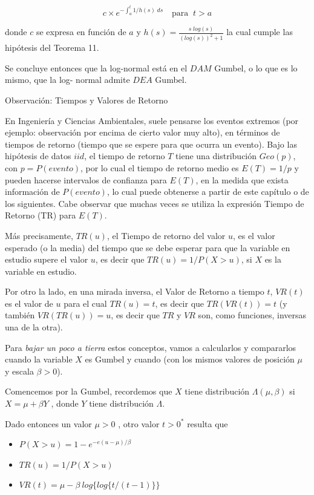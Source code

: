 \documentclass[
]{book}
\theoremstyle{definition}
\theoremstyle{definition}
\theoremstyle{definition}
\theoremstyle{definition}
\theoremstyle{remark}
\begin{document}
\begin{equation}
c\times e^{-\int_{a}^{t}1/h(s)\; ds} \quad \text{para }\: t>a
\end{equation}

donde \(c\) se expresa en función de \(a\) y \(h(s)=\frac{s\; log(s)}{(log(s))^2+1}\) la cual cumple las hipótesis del Teorema 11.

Se concluye entonces que la log-normal está en el \(DAM\) Gumbel, o lo que es lo mismo, que la log- normal admite \(DEA\) Gumbel.

Observación: Tiempos y Valores de Retorno

En Ingeniería y Ciencias Ambientales, suele pensarse los eventos extremos (por ejemplo: observación por encima de cierto valor muy alto), en términos de tiempos de retorno (tiempo que se espere para que ocurra un evento). Bajo las hipótesis de datos \(iid\), el tiempo de retorno \(T\) tiene una distribución \(Geo(p)\), con \(p = P(evento)\), por lo cual el tiempo de retorno medio es \(E(T)=1/p\) y pueden hacerse intervalos de confianza para \(E(T)\), en la medida que exista información de \(P(evento)\), lo cual puede obtenerse a partir de este capítulo o de los siguientes. Cabe observar que muchas veces se utiliza la expresión Tiempo de Retorno (TR) para \(E(T)\).

Más precisamente, \(TR(u)\), el Tiempo de retorno del valor \(u\), es el valor esperado (o la media) del tiempo que se debe esperar para que la variable en estudio supere el valor \(u\), es decir que \(TR(u) = 1/P(X>u)\), si \(X\) es la variable en estudio.

Por otro la lado, en una mirada inversa, el Valor de Retorno a tiempo \(t\), \(VR(t)\) es el valor de \(u\) para el cual \(TR(u)=t\), es decir que \(TR(VR(t))=t\) (y también \(VR(TR(u))=u\), es decir que \(TR\) y \(VR\) son, como funciones, inversas una de la otra).

Para \textit{bajar un poco a tierra} estos conceptos, vamos a calcularlos y compararlos cuando la variable \(X\) es Gumbel y cuando (con los mismos valores de posición \(\mu\) y escala \(\beta>0\)).

Comencemos por la Gumbel, recordemos que \(X\) tiene distribución \(\Lambda( \mu,\beta)\) si \(X= \mu+\beta Y\) , donde \(Y\) tiene distribución \(\Lambda\).

Dado entonces un valor \(\mu>0\) , otro valor \(t>0^*\) resulta que

\begin{itemize}
\item $P(X>u)=1-e^{-e{(u-\mu)/ β }}$
\item $TR(u)=1/P(X>u)$
\item $VR(t)= \mu-\beta\: log\{log\{t/(t-1)\}\}$
\end{itemize}
\end{document}
